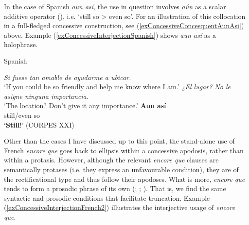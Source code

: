 In the case of Spanish \textit{aun así}, the use in question involves \textit{aún} as a scalar additive operator (), i.e. \lq still so > even so\rq{}. For an illustration of this collocation in a full-fledged concessive construction, see (\ref{exConcessiveConcesquentAunAsi}) above. Example (\ref{exConcessiveInterjectionSpanish}) shows \textit{aun así} as a holophrase.

\begin{exe}
	\ex Spanish
	\label{exConcessiveInterjectionSpanish}
	\begin{xlist}
		 \textit{Si fuese tan amable de ayudarme a ubicar.}\\
		\lq If you could be so friendly and help me know where I am.'
		\textit{¿El lugar? No le asigne ninguna importancia.}\\
		\lq The location? Don't give it any importance.'
		 \gll \textbf{Aun} \textbf{así}.\\
		still/even so\\
		\glt \lq \textbf{Still}!' (CORPES XXI)
	\end{xlist}
\end{exe}

 Other than the cases I have discussed up to this point, the stand-alone use of French \textit{encore que} goes back to ellipsis within a concessive apodosis, rather than within a protasis. However, although the relevant \textit{encore que} clauses are semantically protases (i.e. they express an unfavourable condition), they are of the rectificational type and thus follow their apodoses. What is more, \textit{encore que} tends to form a prosodic phrase of its own (\cite[193]{MosegaardHansen2008}; \cite[10–11]{Morel1996}; \cite[85]{VictorriFuchs1996}). That is, we find the same syntactic and prosodic conditions that facilitate truncation. Example (\ref{exConcessiveInterjectionFrench2}) illustrates the interjective usage of \textit{encore que}.

